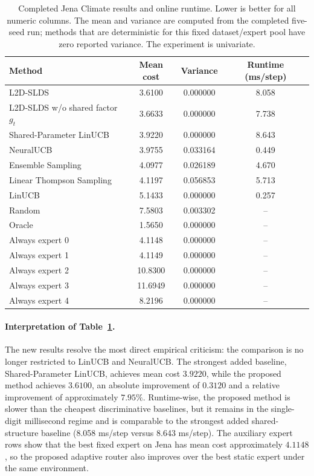 \documentclass[11pt]{article}
\begin{document}
\begin{table}[h]
\centering
\caption{Completed Jena Climate results and online runtime. Lower is better for all numeric columns. The mean and variance are computed from the completed five-seed run; methods that are deterministic for this fixed dataset/expert pool have zero reported variance. The experiment is univariate.}
\label{tab:jena_response}
\begin{tabular}{lccc}
\toprule
\textbf{Method} & \textbf{Mean cost} & \textbf{Variance} & \textbf{Runtime (ms/step)} \\
\midrule
L2D-SLDS & 3.6100 & 0.000000 & 8.058 \\
L2D-SLDS w/o shared factor $g_t$ & 3.6633 & 0.000000 & 7.738 \\
Shared-Parameter LinUCB & 3.9220 & 0.000000 & 8.643 \\
NeuralUCB & 3.9755 & 0.033164 & 0.449 \\
Ensemble Sampling & 4.0977 & 0.026189 & 4.670 \\
Linear Thompson Sampling & 4.1197 & 0.056853 & 5.713 \\
LinUCB & 5.1433 & 0.000000 & 0.257 \\
Random & 7.5803 & 0.003302 & -- \\
Oracle & 1.5650 & 0.000000 & -- \\
\midrule
Always expert 0 & 4.1148 & 0.000000 & -- \\
Always expert 1 & 4.1149 & 0.000000 & -- \\
Always expert 2 & 10.8300 & 0.000000 & -- \\
Always expert 3 & 11.6949 & 0.000000 & -- \\
Always expert 4 & 8.2196 & 0.000000 & -- \\
\bottomrule
\end{tabular}
\end{table}

\paragraph{Interpretation of Table~\ref{tab:jena_response}.}
The new results resolve the most direct empirical criticism: the comparison is no longer restricted to LinUCB and NeuralUCB. The strongest added baseline, Shared-Parameter LinUCB, achieves mean cost $3.9220$, while the proposed method achieves $3.6100$, an absolute improvement of $0.3120$ and a relative improvement of approximately $7.95\%$. Runtime-wise, the proposed method is slower than the cheapest discriminative baselines, but it remains in the single-digit millisecond regime and is comparable to the strongest added shared-structure baseline (8.058 ms/step versus 8.643 ms/step).
The auxiliary expert rows show that the best fixed expert on Jena has mean cost approximately $4.1148$, so the proposed adaptive router also improves over the best static expert under the same environment.
\end{document}
